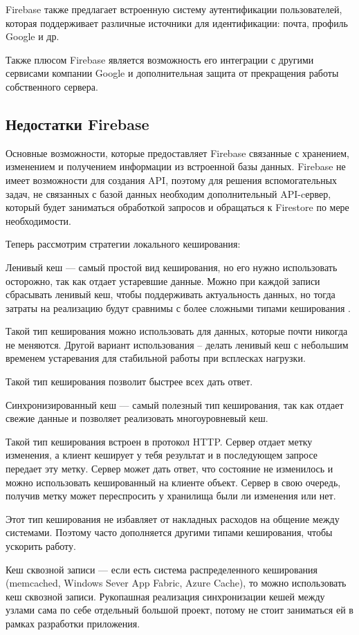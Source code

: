 Firebase также предлагает встроенную систему аутентификации пользователей, которая поддерживает различные источники для идентификации: почта, профиль Google и др.

Также плюсом Firebase является возможность его интеграции с другими сервисами компании Google и дополнительная защита от прекращения работы собственного сервера.

\subsection{Недостатки Firebase}
Основные возможности, которые предоставляет Firebase связанные с хранением, изменением и получением информации из встроенной базы данных. Firebase не имеет возможности для создания API, поэтому для решения вспомогательных задач, не связанных с базой данных необходим дополнительный API-cервер, который будет заниматься обработкой запросов и обращаться к Firestore по мере необходимости.

Теперь рассмотрим стратегии локального кеширования:

Ленивый кеш — самый простой вид кеширования, но его нужно использовать осторожно, так как отдает устаревшие данные. Можно при каждой записи сбрасывать ленивый кеш, чтобы поддерживать актуальность данных, но тогда затраты на реализацию будут сравнимы с более сложными типами кеширования \cite{web15}.

Такой тип кеширования можно использовать для данных, которые почти никогда не меняются. Другой вариант использования – делать ленивый кеш с небольшим временем устаревания для стабильной работы при всплесках нагрузки.

Такой тип кеширования позволит быстрее всех дать ответ.

Синхронизированный кеш — самый полезный тип кеширования, так как отдает свежие данные и позволяет реализовать многоуровневый кеш.

Такой тип кеширования встроен в протокол HTTP. Сервер отдает метку изменения, а клиент кеширует у тебя результат и в последующем запросе передает эту метку. Сервер может дать ответ, что состояние не изменилось и можно использовать кешированный на клиенте объект. Сервер в свою очередь, получив метку может переспросить у хранилища были ли изменения или нет.

Этот тип кеширования не избавляет от накладных расходов на общение между системами. Поэтому часто дополняется другими типами кеширования, чтобы ускорить работу.

Кеш сквозной записи — если есть система распределенного кеширования (memcached, Windows Sever App Fabric, Azure Cache), то можно использовать кеш сквозной записи. Рукопашная реализация синхронизации кешей между узлами сама по себе отдельный большой проект, потому не стоит заниматься ей в рамках разработки приложения.

